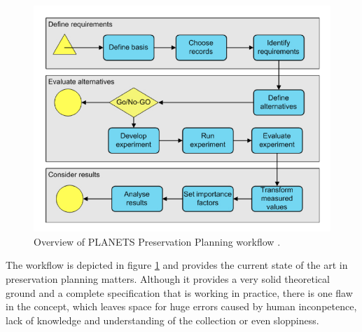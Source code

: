 \begin{figure}[htb]
\begin{center}
\includegraphics[width=4.5in]{figures/contentprofiling/planningworkflow.png}
\caption{Overview of PLANETS Preservation Planning workflow \cite{STR07_jcdl}.}
\label{fig:planningworkflow}
\end{center}
\end{figure}

The workflow is depicted in figure \ref{fig:planningworkflow} and provides the current state of the art in preservation planning matters. Although it provides a very solid theoretical ground and a complete specification that is working in practice, there is one flaw in the concept, which leaves space for huge errors caused by human inconpetence, lack of knowledge and understanding of the collection or even sloppiness.

